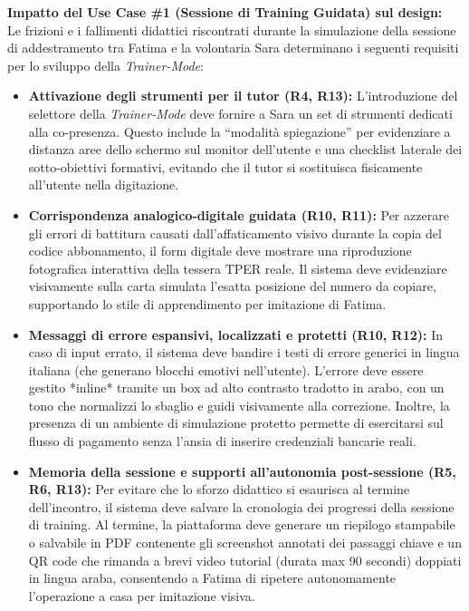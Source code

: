 \documentclass[11pt,a4paper]{article}
\begin{document}
\begin{center}
\begin{tcolorbox}[colback=backgroundColor,colframe=borderColor,arc=2mm]
    {\small
    \textbf{Impatto del Use Case \#1 (Sessione di Training Guidata) sul design:} \\[4pt]
    Le frizioni e i fallimenti didattici riscontrati durante la simulazione della sessione di addestramento tra Fatima e la volontaria Sara determinano i seguenti requisiti per lo sviluppo della \textit{Trainer-Mode}:
    \begin{itemize}[leftmargin=*]
        \item \textbf{Attivazione degli strumenti per il tutor (R4, R13):} L'introduzione del selettore della \textit{Trainer-Mode} deve fornire a Sara un set di strumenti dedicati alla co-presenza. Questo include la ``modalità spiegazione'' per evidenziare a distanza aree dello schermo sul monitor dell'utente e una checklist laterale dei sotto-obiettivi formativi, evitando che il tutor si sostituisca fisicamente all'utente nella digitazione.
        \item \textbf{Corrispondenza analogico-digitale guidata (R10, R11):} Per azzerare gli errori di battitura causati dall'affaticamento visivo durante la copia del codice abbonamento, il form digitale deve mostrare una riproduzione fotografica interattiva della tessera TPER reale. Il sistema deve evidenziare visivamente sulla carta simulata l'esatta posizione del numero da copiare, supportando lo stile di apprendimento per imitazione di Fatima.
        \item \textbf{Messaggi di errore espansivi, localizzati e protetti (R10, R12):} In caso di input errato, il sistema deve bandire i testi di errore generici in lingua italiana (che generano blocchi emotivi nell'utente). L'errore deve essere gestito *inline* tramite un box ad alto contrasto tradotto in arabo, con un tono che normalizzi lo sbaglio e guidi visivamente alla correzione. Inoltre, la presenza di un ambiente di simulazione protetto permette di esercitarsi sul flusso di pagamento senza l'ansia di inserire credenziali bancarie reali.
        \item \textbf{Memoria della sessione e supporti all'autonomia post-sessione (R5, R6, R13):} Per evitare che lo sforzo didattico si esaurisca al termine dell'incontro, il sistema deve salvare la cronologia dei progressi della sessione di training. Al termine, la piattaforma deve generare un riepilogo stampabile o salvabile in PDF contenente gli screenshot annotati dei passaggi chiave e un QR code che rimanda a brevi video tutorial (durata max 90 secondi) doppiati in lingua araba, consentendo a Fatima di ripetere autonomamente l'operazione a casa per imitazione visiva.
    \end{itemize}
    }
\end{tcolorbox}

\vspace{0.3cm}

\end{center}
\end{document}

